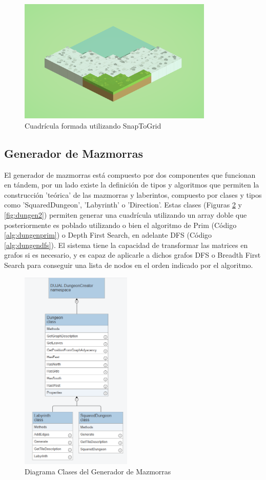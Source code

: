  \begin{figure}[H]
  \centering
    \includegraphics[width=350px,clip=true]{snaptogrid.png}
  \caption{Cuadrícula formada utilizando SnapToGrid}
  \label{fig:snaptogrid}
\end{figure}

\subsection{Generador de Mazmorras}
El generador de mazmorras está compuesto por dos componentes  que funcionan en tándem, por un lado existe la definición de tipos y algoritmos que permiten la construcción 
'teórica' de las mazmorras y laberintos, compuesto por clases y tipos como 'SquaredDungeon', 'Labyrinth' o 'Direction'. Estas clases (Figuras \ref{fig:dungen1} y \ref{fig:dungen2}) permiten generar una cuadrícula utilizando 
un array doble que posteriormente es poblado utilizando o bien el algoritmo de Prim (Código \ref{alg:dungenprim}) o Depth First Search, en adelante DFS (Código \ref{alg:dungendfs}). El sistema tiene la capacidad de transformar las matrices en grafos si es necesario, y es capaz de aplicarle a dichos grafos 
DFS o Breadth First Search para conseguir una lista de nodos en el orden indicado por el algoritmo.  

\begin{figure}[H]
  \centering
    \includegraphics[width=200px,clip=true]{Dungeon_Generator.png}
  \caption{Diagrama Clases del Generador de Mazmorras}
  \label{fig:dungen1}
\end{figure}


